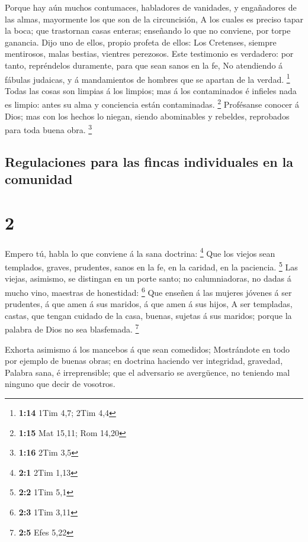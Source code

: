  Porque hay aún muchos contumaces, habladores de vanidades,
y engañadores de las almas, mayormente los que son de la circuncisión,
 A los cuales es preciso tapar la boca; que trastornan
casas enteras; enseñando lo que no conviene, por torpe ganancia.
 Dijo uno de ellos, propio profeta de ellos: Los Cretenses,
siempre mentirosos, malas bestias, vientres perezosos. 
Este testimonio es verdadero: por tanto, repréndelos duramente, para que
sean sanos en la fe,  No atendiendo á fábulas judaicas, y á
mandamientos de hombres que se apartan de la verdad. \footnote{\textbf{1:14}
  1Tim 4,7; 2Tim 4,4}  Todas las cosas son limpias á los
limpios; mas á los contaminados é infieles nada es limpio: antes su alma
y conciencia están contaminadas. \footnote{\textbf{1:15} Mat 15,11; Rom
  14,20}  Profésanse conocer á Dios; mas con los hechos lo
niegan, siendo abominables y rebeldes, reprobados para toda buena obra.
\footnote{\textbf{1:16} 2Tim 3,5}

\hypertarget{regulaciones-para-las-fincas-individuales-en-la-comunidad}{%
\subsection{Regulaciones para las fincas individuales en la
comunidad}\label{regulaciones-para-las-fincas-individuales-en-la-comunidad}}

\hypertarget{section-1}{%
\section{2}\label{section-1}}

 Empero tú, habla lo que conviene á la sana doctrina:
\footnote{\textbf{2:1} 2Tim 1,13}  Que los viejos sean
templados, graves, prudentes, sanos en la fe, en la caridad, en la
paciencia. \footnote{\textbf{2:2} 1Tim 5,1}  Las viejas,
asimismo, se distingan en un porte santo; no calumniadoras, no dadas á
mucho vino, maestras de honestidad: \footnote{\textbf{2:3} 1Tim 3,11}
 Que enseñen á las mujeres jóvenes á ser prudentes, á que
amen á sus maridos, á que amen á sus hijos,  A ser
templadas, castas, que tengan cuidado de la casa, buenas, sujetas á sus
maridos; porque la palabra de Dios no sea blasfemada. \footnote{\textbf{2:5}
  Efes 5,22}

 Exhorta asimismo á los mancebos á que sean comedidos;
 Mostrándote en todo por ejemplo de buenas obras; en
doctrina haciendo ver integridad, gravedad,  Palabra sana, é
irreprensible; que el adversario se avergüence, no teniendo mal ninguno
que decir de vosotros.

